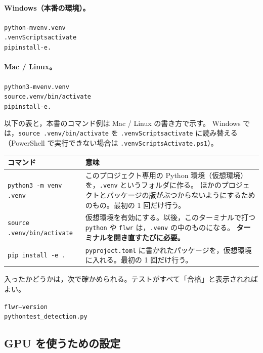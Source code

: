 \documentclass[a4j, dvipdfmx]{jsarticle}  %
\newenvironment{cmd}{\par\vspace{0.3em}\begin{alltt}\small}{\end{alltt}\vspace{0.3em}\par}
\begin{document}
\paragraph{Windows（本番の環境）。}
\begin{cmd}
python -m venv .venv
.venvScriptsactivate
pip install -e .
\end{cmd}

\paragraph{Mac / Linux。}
\begin{cmd}
python3 -m venv .venv
source .venv/bin/activate
pip install -e .
\end{cmd}

以下の表と，本書のコマンド例は Mac / Linux の書き方で示す。
Windows では，\texttt{source .venv/bin/activate} を \texttt{.venvScriptsactivate} に読み替える
（PowerShell で実行できない場合は \texttt{.venvScriptsActivate.ps1}）。

\begin{table}[H]
\centering
\begin{tabular}{@{}P{5.3cm} P{10.0cm}@{}}
\toprule
コマンド & 意味 \\
\midrule
\texttt{python3 -m venv .venv} & このプロジェクト専用の Python 環境（仮想環境）を，\texttt{.venv} というフォルダに作る。
ほかのプロジェクトとパッケージの版がぶつからないようにするためのもの。最初の 1 回だけ行う。 \\
\texttt{source .venv/bin/activate} & 仮想環境を有効にする。以後，このターミナルで打つ \texttt{python} や \texttt{flwr} は，\texttt{.venv} の中のものになる。
\textbf{ターミナルを開き直すたびに必要。} \\
\texttt{pip install -e .} & \texttt{pyproject.toml} に書かれたパッケージを，仮想環境に入れる。最初の 1 回だけ行う。 \\
\bottomrule
\end{tabular}
\end{table}

入ったかどうかは，次で確かめられる。テストがすべて「合格」と表示されればよい。

\begin{cmd}
flwr --version
python test_detection.py
\end{cmd}

\subsection{GPU を使うための設定}
\label{sec:gpu}
\end{document}
